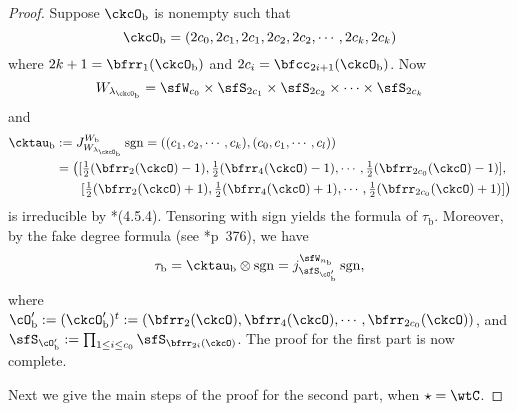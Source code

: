 \documentclass[12pt,a4paper]{amsart}
\newcommand{\sgn}{\operatorname{sgn}}
\numberwithin{equation}{section}
\theoremstyle{remark}
\def\half{{\tfrac{1}{2}}}
\def\lamckb{\lambda_{\ckcO_{\mathrm b}}}
\begin{document}
\begin{proof}
    Suppose $\ckcO_{\mathrm b}$ is nonempty
    such that
    \[
      \ckcO_{\mathrm b} = (2c_{0},2c_{1}, 2c_{1}, 2c_{2},2c_{2}, \cdots, 2c_{k}, 2c_{k})
    \]
    where $2k+1=\bfrr_{1}(\ckcO_{\mathrm b})$ and $2c_{i} = \bfcc_{2i+1}(\ckcO_{\mathrm b})$.
    Now
    \[
      W_{\lamckb} = \sfW_{c_{0}} \times \sfS_{2c_{1}} \times \sfS_{2c_{2}}\times \cdots \times \sfS_{2c_{k}}
    \]
    and %
    \[
      \begin{split}
        \cktau_{\mathrm b} &:= J_{W_{\lamckb}}^{W_{\mathrm b}} \sgn
        = ((c_{1},c_{2},\cdots, c_{k}),(c_{0},c_{1}, \cdots, c_{l}))\\
        & = \big([\half(\bfrr_{2}(\ckcO)-1),\half(\bfrr_{4}(\ckcO)-1),\cdots, \half(\bfrr_{2c_{0}}(\ckcO)-1)],\\
        & \hspace{2em} [\half(\bfrr_{2}(\ckcO)+1),\half(\bfrr_{4}(\ckcO)+1),\cdots, \half(\bfrr_{2c_{0}}(\ckcO)+1)]\big)
      \end{split}
    \]
    is irreducible by \cite{Lu}*{(4.5.4)}. Tensoring with sign yields the
    formula of $\tau_{\mathrm b}$. Moreover, by the fake degree formula (see
    \cite{Carter}*{p~376}), we have
    \[
      \tau_{\mathrm b} = \cktau_{\mathrm b}\otimes \sgn = j_{\sfS_{\cO'_{\mathrm b}}}^{\sfW_{n_{\mathrm b}}} \sgn,
    \]
    where
    $ \cO'_{\mathrm b} := (\ckcO'_{\mathrm b})^{t}:=(\bfrr_{2}(\ckcO),\bfrr_{4}(\ckcO),\cdots , \bfrr_{2c_{0}}(\ckcO))$, and $\sfS_{\cO'_{\mathrm b}} := \prod_{1\leq i\leq c_{0}}\sfS_{\bfrr_{2i}(\ckcO)}$. The proof for the first part is now complete.

    \medskip \def\ckfll{\check{\fll}}

    Next we give the main steps of the proof for the second part, when $\star = \wtC$.


\end{proof}
\end{document}

